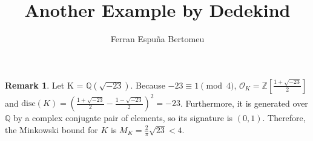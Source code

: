 \documentclass[11pt]{article}
\title{Another Example by Dedekind}
\author{Ferran Espuña Bertomeu}
\theoremstyle{definition}
\newtheorem*{rk}{Remark}
\begin{document}
    \maketitle

    \begin{rk}
        Let K = $\mathbb{Q}\left(\sqrt {-23}\right)$.
        Because $-23 \equiv 1 \pmod 4$, $\mathcal{O}_K = \mathbb{Z}\left[\frac{1+\sqrt {-23}}{2}\right]$
        and
        $\text{disc}(K) = \left(
        \frac{1+\sqrt {-23}}{2} - \frac{1-\sqrt {-23}}{2}
        \right)^2 = -23$.
        Furthermore, it is generated over $\mathbb{Q}$ by a complex conjugate pair of elements, so its signature is $(0,1)$.
        Therefore, the Minkowski bound for $K$ is ${M_K = \frac{2}{\pi}\sqrt{23} < 4}$.
        
    \end{rk}
\end{document}
